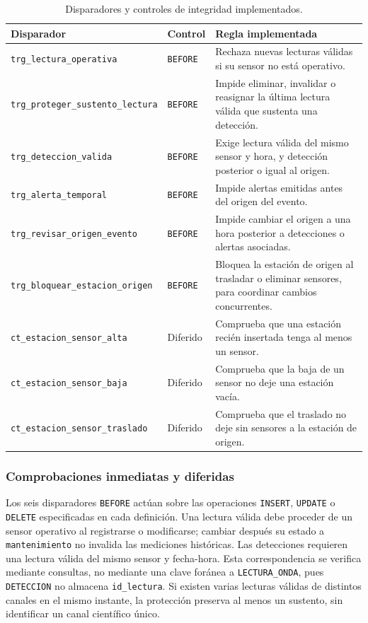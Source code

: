 \documentclass[12pt,a4paper]{article}
\begin{document}
\begin{table}[H]
\centering
\footnotesize
\setlength{\tabcolsep}{4pt}
\renewcommand{\arraystretch}{1.14}
\begin{tabular}{>{\raggedright\arraybackslash}p{5.8cm}>{\centering\arraybackslash}p{1.7cm}>{\raggedright\arraybackslash}p{6.65cm}}
\toprule
\textbf{Disparador} & \textbf{Control} & \textbf{Regla implementada} \\
\midrule
\nolinkurl{trg_lectura_operativa} & \texttt{BEFORE} & Rechaza nuevas lecturas válidas si su sensor no está operativo. \\
\nolinkurl{trg_proteger_sustento_lectura} & \texttt{BEFORE} & Impide eliminar, invalidar o reasignar la última lectura válida que sustenta una detección. \\
\nolinkurl{trg_deteccion_valida} & \texttt{BEFORE} & Exige lectura válida del mismo sensor y hora, y detección posterior o igual al origen. \\
\nolinkurl{trg_alerta_temporal} & \texttt{BEFORE} & Impide alertas emitidas antes del origen del evento. \\
\nolinkurl{trg_revisar_origen_evento} & \texttt{BEFORE} & Impide cambiar el origen a una hora posterior a detecciones o alertas asociadas. \\
\nolinkurl{trg_bloquear_estacion_origen} & \texttt{BEFORE} & Bloquea la estación de origen al trasladar o eliminar sensores, para coordinar cambios concurrentes. \\
\midrule
\nolinkurl{ct_estacion_sensor_alta} & Diferido & Comprueba que una estación recién insertada tenga al menos un sensor. \\
\nolinkurl{ct_estacion_sensor_baja} & Diferido & Comprueba que la baja de un sensor no deje una estación vacía. \\
\nolinkurl{ct_estacion_sensor_traslado} & Diferido & Comprueba que el traslado no deje sin sensores a la estación de origen. \\
\bottomrule
\end{tabular}
\caption{Disparadores y controles de integridad implementados.}
\label{tab:triggers-46}
\end{table}

\subsubsection*{Comprobaciones inmediatas y diferidas}

Los seis disparadores \texttt{BEFORE} actúan sobre las operaciones
\texttt{INSERT}, \texttt{UPDATE} o \texttt{DELETE} especificadas en
cada definición. Una lectura válida debe proceder de un sensor
operativo al registrarse o modificarse; cambiar después su estado a
\texttt{mantenimiento} no invalida las mediciones históricas. Las
detecciones requieren una lectura válida del mismo sensor y fecha-hora.
Esta correspondencia se verifica mediante consultas, no mediante una
clave foránea a \texttt{LECTURA\_ONDA}, pues \texttt{DETECCION} no
almacena \texttt{id\_lectura}. Si existen varias lecturas válidas de
distintos canales en el mismo instante, la protección preserva al
menos un sustento, sin identificar un canal científico único.
\end{document}

